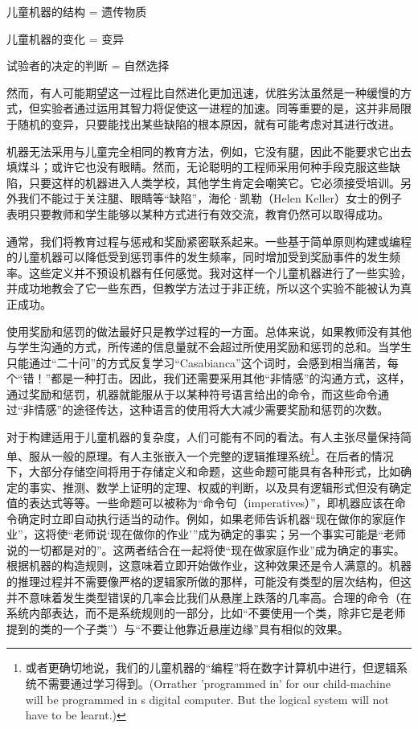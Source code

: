 \documentclass[12pt,a4paper,twoside]{article}
\begin{document}
儿童机器的结构 = 遗传物质

儿童机器的变化 = 变异

试验者的决定的判断 = 自然选择

然而，有人可能期望这一过程比自然进化更加迅速，优胜劣汰虽然是一种缓慢的方式，但实验者通过运用其智力将促使这一进程的加速。同等重要的是，这并非局限于随机的变异，只要能找出某些缺陷的根本原因，就有可能考虑对其进行改进。

机器无法采用与儿童完全相同的教育方法，例如，它没有腿，因此不能要求它出去填煤斗；或许它也没有眼睛。然而，无论聪明的工程师采用何种手段克服这些缺陷，只要这样的机器进入人类学校，其他学生肯定会嘲笑它。它必须接受培训。另外我们不能过于关注腿、眼睛等“缺陷”，海伦·凯勒（Helen Keller）女士的例子表明只要教师和学生能够以某种方式进行有效交流，教育仍然可以取得成功。

通常，我们将教育过程与惩戒和奖励紧密联系起来。一些基于简单原则构建或编程的儿童机器可以降低受到惩罚事件的发生频率，同时增加受到奖励事件的发生频率。这些定义并不预设机器有任何感觉。我对这样一个儿童机器进行了一些实验，并成功地教会了它一些东西，但教学方法过于非正统，所以这个实验不能被认为真正成功。

使用奖励和惩罚的做法最好只是教学过程的一方面。总体来说，如果教师没有其他与学生沟通的方式，所传递的信息量就不会超过所使用奖励和惩罚的总和。当学生只能通过“二十问”的方式反复学习“Casabianca”这个词时，会感到相当痛苦，每个“错！”都是一种打击。因此，我们还需要采用其他“非情感”的沟通方式，这样，通过奖励和惩罚，机器就能服从于以某种符号语言给出的命令，而这些命令通过“非情感”的途径传达，这种语言的使用将大大减少需要奖励和惩罚的次数。

对于构建适用于儿童机器的复杂度，人们可能有不同的看法。有人主张尽量保持简单、服从一般的原理。有人主张嵌入一个完整的逻辑推理系统\footnote{或者更确切地说，我们的儿童机器的“编程”将在数字计算机中进行，但逻辑系统不需要通过学习得到。(Orrather ’programmed in’ for our child-machine will be programmed in s digital computer. But the logical system will not have to be learnt.)}。在后者的情况下，大部分存储空间将用于存储定义和命题，这些命题可能具有各种形式，比如确定的事实、推测、数学上证明的定理、权威的判断，以及具有逻辑形式但没有确定值的表达式等等。一些命题可以被称为“命令句（imperatives）”，即机器应该在命令确定时立即自动执行适当的动作。例如，如果老师告诉机器“现在做你的家庭作业”，这将使“老师说‘现在做你的作业’”成为确定的事实；另一个事实可能是“老师说的一切都是对的”。这两者结合在一起将使“现在做家庭作业”成为确定的事实。根据机器的构造规则，这意味着立即开始做作业，这种效果还是令人满意的。机器的推理过程并不需要像严格的逻辑家所做的那样，可能没有类型的层次结构，但这并不意味着发生类型错误的几率会比我们从悬崖上跌落的几率高。合理的命令（在系统内部表达，而不是系统规则的一部分，比如“不要使用一个类，除非它是老师提到的类的一个子类”）与“不要让他靠近悬崖边缘”具有相似的效果。
\end{document}
